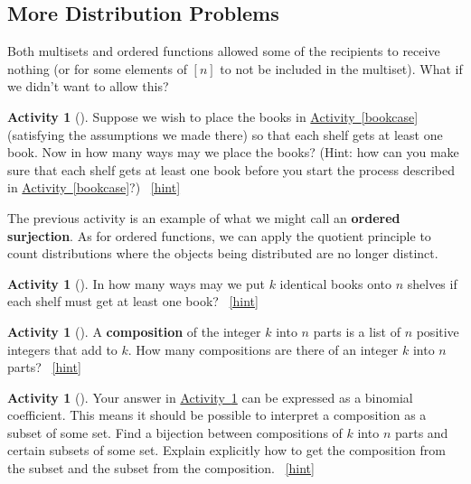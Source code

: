 \documentclass[10pt,]{book}
\newcommand{\terminology}[1]{\textbf{#1}}
\theoremstyle{plain}
\theoremstyle{definition}
\theoremstyle{definition}
\theoremstyle{definition}
\newtheorem{activity}[project]{Activity}
\numberwithin{equation}{chapter}
\begin{document}
\subsection[{More Distribution Problems}]{More Distribution Problems}\label{subsec-moredistributions}
\hypertarget{p-423}{}%
Both multisets and ordered functions allowed some of the recipients to receive nothing (or for some elements of \([n]\) to not be included in the multiset).  What if we didn't want to allow this?%
\begin{activity}[]\label{bookcaseeveryshelf}
\hypertarget{p-424}{}%
Suppose we wish to place the books in \hyperref[bookcase]{Activity~\ref{bookcase}} (satisfying the assumptions we made there) so that each shelf gets at least one book. Now in how many ways may we place the books? (Hint: how can you make sure that each shelf gets at least one book before you start the process described in \hyperref[bookcase]{Activity~\ref{bookcase}}?)%
~\hfill{\tiny\hyperlink{a-64}{[hint]}\hypertarget{q-64}{}}\end{activity}
\hypertarget{p-427}{}%
The previous activity is an example of what we might call an \terminology{ordered surjection}.  As for ordered functions, we can apply the quotient principle to count distributions where the objects being distributed are no longer distinct.%
\begin{activity}[]\label{activity-65}
\hypertarget{p-428}{}%
In how many ways may we put \(k\) identical books onto \(n\) shelves if each shelf must get at least one book?%
~\hfill{\tiny\hyperlink{a-65}{[hint]}\hypertarget{q-65}{}}\end{activity}
\begin{activity}[]\label{compositionagian}
\hypertarget{p-431}{}%
A \terminology{composition} of the integer \(k\) into \(n\) parts is a list of \(n\) positive integers that add to \(k\).  How many compositions are there of an integer \(k\) into \(n\) parts?%
~\hfill{\tiny\hyperlink{a-66}{[hint]}\hypertarget{q-66}{}}\end{activity}
\begin{activity}[]\label{activity-67}
\hypertarget{p-434}{}%
Your answer in \hyperref[compositionagian]{Activity~\ref{compositionagian}} can be expressed as a binomial coefficient. This means it should be possible to interpret a composition as a subset of some set. Find a bijection between compositions of \(k\) into \(n\) parts and certain subsets of some set.  Explain explicitly how to get the composition from the subset and the subset from the composition.%
~\hfill{\tiny\hyperlink{a-67}{[hint]}\hypertarget{q-67}{}}\end{activity}
\end{document}
